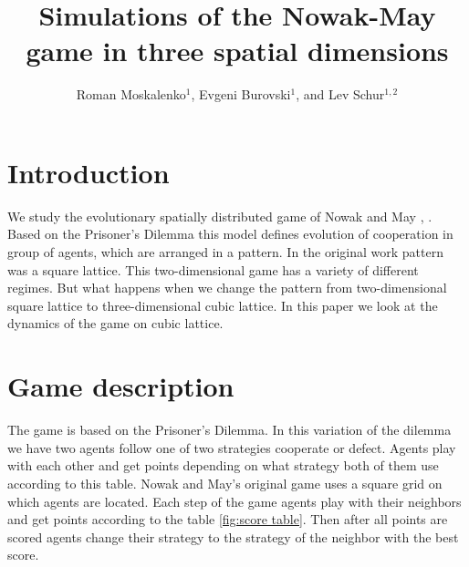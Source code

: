 \documentclass[a4paper]{jpconf}
\begin{document}
\title{Simulations of the Nowak-May game in three spatial dimensions}
\author{Roman Moskalenko$^{1}$, Evgeni Burovski$^{1}$, and Lev Schur$^{1, 2}$}
%
\address{$^1$ National Research University Higher School of Economics, 101000 Moscow, Russia}
\address{$^2$ Landau Institute for Theoretical Physics, 142432 Chernogolovka, Russia}



\section{Introduction}

We study the evolutionary spatially distributed game of Nowak and May \cite{nowak and may 1}, \cite{nowak and may 2}. Based on the Prisoner’s Dilemma this model defines evolution of cooperation in group of agents, which are arranged in a pattern. In the original work pattern was a square lattice. This two-dimensional game has a variety of different regimes. But what happens when we change the pattern from two-dimensional square lattice to three-dimensional cubic lattice. In this paper we look at the dynamics of the game on cubic lattice.


\section{Game description}

The game is based on the Prisoner’s Dilemma. In this variation of the dilemma we have two agents follow one of two strategies cooperate or defect. Agents play with each other and get points depending on what strategy both of them use according to this table. Nowak and May's original game uses a square grid on which agents are located. Each step of the game agents play with their neighbors and get points according to the table \ref{fig:score table}. Then after all points are scored agents change their strategy to the strategy of the neighbor with the best score.
\end{document}
